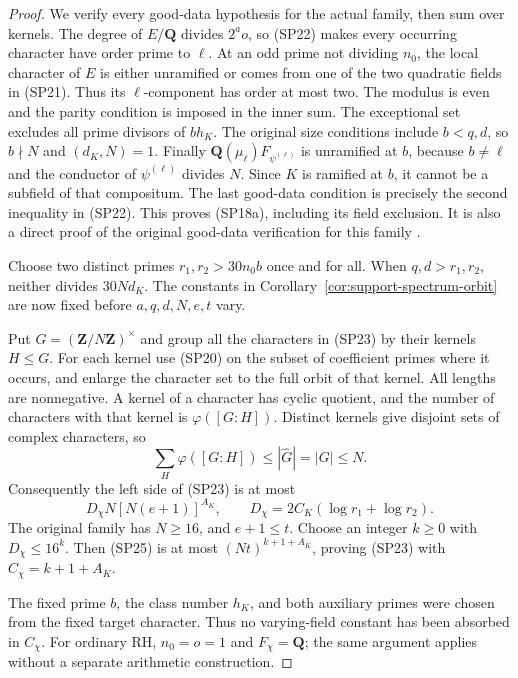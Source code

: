 \begin{proof}
We verify every good-data hypothesis for the actual family,
then sum over kernels.  The degree of $E/\mathbf Q$ divides
$2^ao$, so (SP22) makes every occurring character have
order prime to $\ell$.  At an odd prime not dividing $n_0$,
the local character of $E$ is either unramified or comes
from one of the two quadratic fields in (SP21).  Thus its
$\ell$-component has order at most two.  The modulus is even
and the parity condition is imposed in the inner sum.
The exceptional set excludes all prime divisors of $bh_K$.
The original size conditions include $b<q,d$, so
$b\nmid N$ and $(d_K,N)=1$.  Finally
$\mathbf Q(\mu_\ell)F_{\psi^{(\ell)}}$ is unramified at $b$,
because $b\ne\ell$ and the conductor of $\psi^{(\ell)}$
divides $N$.  Since $K$ is ramified at $b$, it cannot be a
subfield of that compositum.  The last good-data condition
is precisely the second inequality in (SP22).  This proves
(SP18a), including its field exclusion.  It is also a direct
proof of the original good-data verification for this family
\cite{support-spectrum-case-one-source}.

Choose two distinct primes $r_1,r_2>30n_0b$ once and for all.
When $q,d>r_1,r_2$, neither divides $30Nd_K$.  The constants
in Corollary~\ref{cor:support-spectrum-orbit} are now fixed
before $a,q,d,N,e,t$ vary.

Put $G=(\mathbf Z/N\mathbf Z)^\times$ and group all the
characters in (SP23) by their kernels $H\le G$.  For each
kernel use (SP20) on the subset of coefficient primes where
it occurs, and enlarge the character set to the full orbit
of that kernel.  All lengths are nonnegative.  A kernel of
a character has cyclic quotient, and the number of
characters with that kernel is $\varphi([G:H])$.  Distinct
kernels give disjoint sets of complex characters, so
\[
                 \sum_H\varphi([G:H])\le|\widehat G|
                                   =|G|\le N.                \tag{SP24}
\]
Consequently the left side of (SP23) is at most
\[
 D_\chi N[N(e+1)]^{A_K},\qquad
       D_\chi=2C_K(\log r_1+\log r_2).                        \tag{SP25}
\]
The original family has $N\ge16$, and $e+1\le t$.
Choose an integer $k\ge0$ with $D_\chi\le16^k$.
Then (SP25) is at most $(Nt)^{k+1+A_K}$, proving
(SP23) with $C_\chi=k+1+A_K$.

The fixed prime $b$, the class number $h_K$, and both
auxiliary primes were chosen from the fixed target
character.  Thus no varying-field constant has been
absorbed in $C_\chi$.  For ordinary RH, $n_0=o=1$ and
$F_\chi=\mathbf Q$; the same argument applies without a
separate arithmetic construction.
\end{proof}
